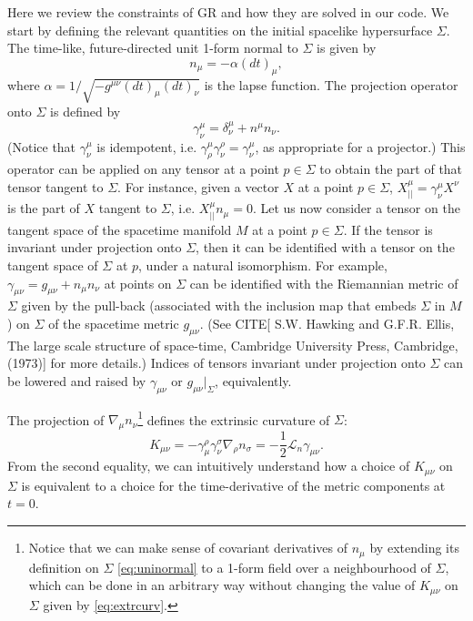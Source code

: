 \documentclass[a4paper,11pt]{article}
\numberwithin{equation}{section}
\begin{document}
Here we review the constraints of GR and how they are solved in our code.
We start by defining the relevant quantities on the initial spacelike hypersurface $\Sigma$. %
The time-like, future-directed unit 1-form normal to $\Sigma$ is given by
\begin{equation}
\label{eq:uninormal}
n_\mu=-\alpha (dt)_\mu,
\end{equation}
where $\alpha=1/\sqrt{-g^{\mu\nu}(dt)_\mu (dt)_\nu}$ is the lapse function. 
The projection operator onto $\Sigma$ is defined by
\begin{equation}
\gamma^\mu_\nu=\delta^\mu_\nu+n^\mu n_\nu.
\end{equation}
(Notice that $\gamma^\mu_\nu$ is idempotent, i.e. $\gamma^\mu_\rho \gamma^\rho_\nu=\gamma^\mu_\nu$, as appropriate for a projector.)
This operator can be applied on any tensor at a point $p\in\Sigma$ to obtain the part of that tensor tangent to $\Sigma$. For instance, given a vector $X$ at a point $p\in\Sigma$, $X_{||}^\mu=\gamma^\mu_\nu X^\nu$ is the part of $X$ tangent to $\Sigma$, i.e. $X_{||}^\mu n_\mu=0$. Let us now consider a tensor on the tangent space of the spacetime manifold $M$ at a point $p\in\Sigma$. If the tensor is invariant under projection onto $\Sigma$, then it can be identified with a tensor on the tangent space of $\Sigma$ at $p$, under a natural isomorphism. For example, $\gamma_{\mu\nu}=g_{\mu\nu}+n_\mu n_\nu$ at points on $\Sigma$ can be identified with the Riemannian metric of $\Sigma$ given by the pull-back (associated with the inclusion map that embeds $\Sigma$ in $M$) on $\Sigma$ of the spacetime metric $g_{\mu\nu}$. (See CITE[ S.W. Hawking and G.F.R. Ellis, The large scale structure of space-time, Cambridge University Press, Cambridge, (1973)] for more details.) Indices of tensors invariant under projection onto $\Sigma$ can be lowered and raised by $\gamma_{\mu\nu}$ or $g_{\mu\nu}|_\Sigma$, equivalently.

The projection of $\nabla_\mu n_\nu$\footnote{Notice that we can make sense of covariant derivatives of $n_\mu$ by extending its definition on $\Sigma$ \eqref{eq:uninormal} to a 1-form field over a neighbourhood of $\Sigma$, which can be done in an arbitrary way without changing the value of $K_{\mu\nu}$ on $\Sigma$ given by \eqref{eq:extrcurv}.} defines the extrinsic curvature of $\Sigma$:
\begin{equation}
\label{eq:extrcurv}
K_{\mu\nu}=-\gamma^\rho_\mu \gamma^\sigma_\nu \nabla_\rho n_\sigma=-\frac{1}{2}\mathcal{L}_n\gamma_{\mu\nu}.
\end{equation}
From the second equality, we can intuitively understand how a choice of $K_{\mu\nu}$ on $\Sigma$ is equivalent to a choice for the time-derivative of the metric components at $t=0$.
\end{document}
